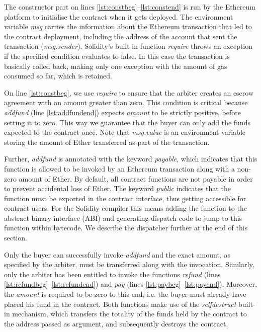 \documentclass[sigplan,10pt]{acmart}\settopmatter{printfolios=true,printccs=false,printacmref=false}
\begin{document}
The constructor part on lines \autoref{lst:constbeg}--\autoref{lst:constend}
is run by the Ethereum platform to initialise the contract when it gets deployed.
The environment variable \textit{msg} carries the information
about the Ethereum transaction that led to the contract deployment, 
including the address of the account that
sent the transaction (\textit{msg.sender}).
Solidity's built-in function \textit{require} throws an exception
if the specified condition evaluates to false.
In this case the transaction is basically rolled back, 
making only one exception with the amount of gas consumed so far, which
is retained. 

On line \ref{lst:constbeg}, we use \textit{require} to ensure that the arbiter creates
an escrow agreement with an amount greater than zero.
This condition is critical because \textit{addfund} (line \autoref{lst:addfundend})
expects \textit{amount} to be strictly positive,
before setting it to zero.
This way we guarantee that the buyer can only add the
funds expected to the contract once.
Note that \textit{msg.value} is an environment variable
storing the amount of Ether transferred as part of the transaction.

Further, \textit{addfund} is annotated with the keyword \textit{payable},
which indicates that this function is allowed to be invoked
by an Ethereum transaction along with a non-zero amount of
Ether.
By default, all contract functions are not payable
in order to prevent accidental loss of Ether.
The keyword \textit{public} indicates that
the function must be exported in the contract interface,
thus getting accessible for contract users.
For the Solidity compiler this means adding the function to the abstract binary
interface (ABI) and generating dispatch code to jump to this function within bytecode.
We describe the dispatcher further at the end of this section.

Only the buyer can successfully invoke \textit{addfund} and
the exact amount, as specified by the arbiter, must be transferred
along with the invocation.
%
Similarly, only the arbiter has been entitled to invoke the functions \textit{refund} (lines \autoref{lst:refundbeg}--\autoref{lst:refundend})
and \textit{pay} (lines \autoref{lst:paybeg}--\autoref{lst:payend}). 
Moreover, the \textit{amount} is required to be zero to this end, i.e.
the buyer must already have placed his fund in the contract. 
Both functions make use of the \textit{selfdestruct} built-in mechanism,
which transfers the totality of the funds held by the contract
to the address passed as argument, and subsequently destroys the contract.
%
\end{document}
